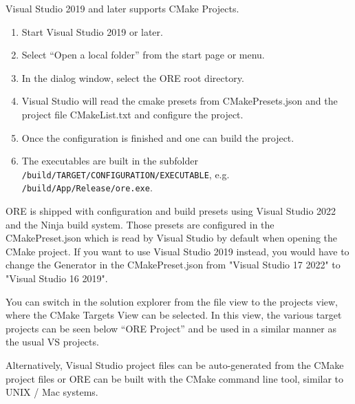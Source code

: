 Visual Studio 2019 and later supports CMake Projects.

\begin{enumerate}
\item Start Visual Studio 2019 or later.
\item Select ``Open a local folder'' from the start page or menu.
\item In the dialog window, select the ORE root directory.
\item Visual Studio will read the cmake presets from CMakePresets.json and the project file CMakeList.txt and configure the project.
\item Once the configuration is finished and one can build the project.
\item The executables are built in the subfolder {\tt /build/TARGET/CONFIGURATION/EXECUTABLE}, e.g. {\tt /build/App/Release/ore.exe}.
\end{enumerate}

ORE is shipped with configuration and build presets using Visual Studio 2022 and the Ninja build system. Those presets are configured in the CMakePreset.json which is read by Visual Studio by default when opening the CMake project. If you want to use Visual Studio 2019 instead, you would have to change the Generator in the CMakePreset.json from "Visual Studio 17 2022" to "Visual Studio 16 2019".

You can switch in the solution explorer from the file view to the projects view, where the CMake Targets View can be selected. In this view, the various target projects can be seen below ``ORE Project'' and be used in a similar manner as the usual VS projects.

\medskip

Alternatively, Visual Studio project files can be auto-generated from the CMake project files or ORE can be built with the CMake command line tool, similar to UNIX / Mac systems.

